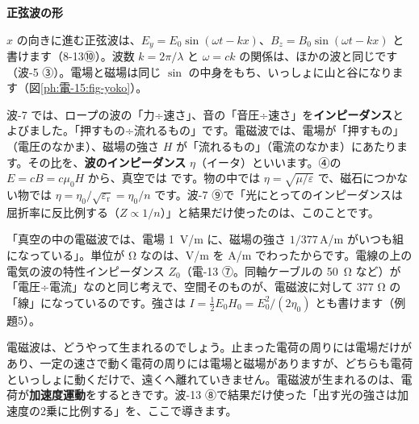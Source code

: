 \noindent\textbf{正弦波の形}\par\nobreak
$x$ の向きに進む正弦波は、$E_y=E_0\sin(\omega t-kx)$、$B_z=B_0\sin(\omega t-kx)$ と書けます（8-13⑩）。波数 $k=2\pi/\lambda$ と $\omega=ck$ の関係は、ほかの波と同じです（波-5 ③）。電場と磁場は同じ $\sin$ の中身をもち、いっしょに山と谷になります（図\ref{ph:電-15:fig-yoko}）。


\leavevmode\label{ph:電-15:sec7}波-7 では、ロープの波の「力÷速さ」、音の「音圧÷速さ」を\textbf{インピーダンス}とよびました。「押すもの÷流れるもの」です。電磁波では、電場が「押すもの」（電圧のなかま）、磁場の強さ $H$ が「流れるもの」（電流のなかま）にあたります。その比を、\textbf{波のインピーダンス} $\eta$（イータ）といいます。④の $E=cB=c\mu_0H$ から、真空では
\label{ph:電-15:eta}です。物の中では $\eta=\sqrt{\mu/\varepsilon}$ で、磁石につかない物では $\eta=\eta_0/\sqrt{\varepsilon_{\mathrm r}}=\eta_0/n$ です。波-7 ⑨で「光にとってのインピーダンスは屈折率に反比例する（$Z\propto1/n$）」と結果だけ使ったのは、このことです。

\begin{phyomi}
「真空の中の電磁波では、電場 \qty{1}{V/m} に、磁場の強さ $1/377$\,A/m がいつも組になっている」。単位が Ω なのは、V/m を A/m でわったからです。電線の上の電気の波の特性インピーダンス $Z_0$（電-13 ⑦。同軸ケーブルの \qty{50}{\ohm} など）が「電圧÷電流」なのと同じ考えで、空間そのものが、電磁波に対して 377 Ω の「線」になっているのです。強さは $I=\tfrac12E_0H_0=E_0^2/(2\eta_0)$ とも書けます（例題5）。
\end{phyomi}


\leavevmode\label{ph:電-15:sec8}電磁波は、どうやって生まれるのでしょう。止まった電荷の周りには電場だけがあり、一定の速さで動く電荷の周りには電場と磁場がありますが、どちらも電荷といっしょに動くだけで、遠くへ離れていきません。電磁波が生まれるのは、電荷が\textbf{加速度運動}をするときです。波-13 ⑧で結果だけ使った「出す光の強さは加速度の2乗に比例する」を、ここで導きます。

